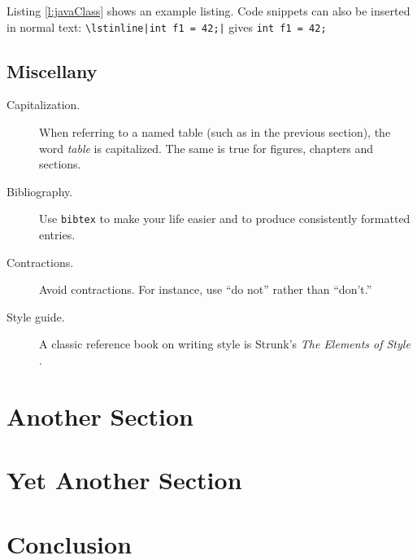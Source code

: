 \documentclass[authoryear,preprint]{sigplanconf}
\begin{document}
Listing \ref{l:javaClass} shows an example listing. Code snippets can
also be inserted in normal text:
\verb$\lstinline|int f1 = 42;|$ gives \lstinline$int f1 = 42;$


\subsection{Miscellany}

\begin{description}

\item[Capitalization.] When referring to a named table (such as in the
  previous section), the word \emph{table} is capitalized. The same is
  true for figures, chapters and sections.

\item[Bibliography.] Use \verb|bibtex| to make your life easier and to
  produce consistently formatted entries.

\item[Contractions.] Avoid contractions. For instance, use ``do not''
  rather than ``don't.''

\item[Style guide.] A classic reference book on writing style is
  Strunk's \emph{The Elements of Style} \cite{Strunk-ElementsOfStyle}.

\end{description}


\section{Another Section}

\blindtext %


\section{Yet Another Section}

\blindtext %


\section{Conclusion}

\blindtext %






\end{document}
